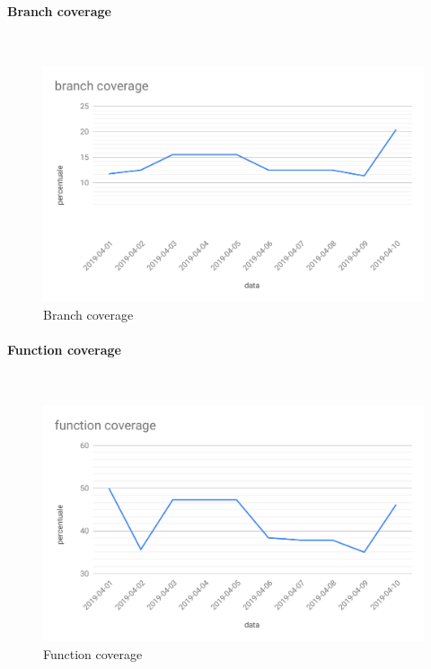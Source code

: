 \paragraph{Branch coverage}\mbox{}\\
\begin{figure}[H]
	\centering
	\includegraphics[scale=0.6]{res/images/RQ/branch-coverage-RQ.pdf}
	\caption{Branch coverage}
\end{figure}
\paragraph{Function coverage}\mbox{}\\
\begin{figure}[H]
	\centering
	\includegraphics[scale=0.6]{res/images/RQ/function-coverage-RQ.pdf}
	\caption{Function coverage}
\end{figure}
